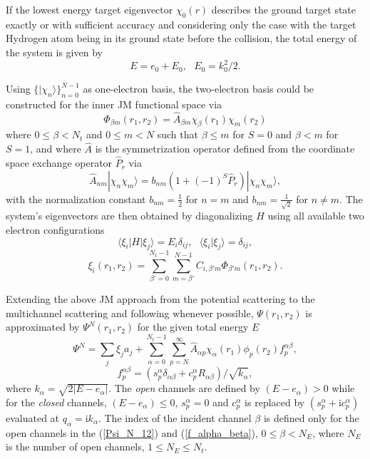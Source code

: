\documentclass[aip,pra,showpacs,aps,twocolumn,groupedaddress,floatfix]{revtex4}
\newcommand{\beq}{\begin{equation}}
\newcommand{\eeq}{\end{equation}}
\begin{document}
If the lowest energy target eigenvector $\chi_0(r)$  describes the ground target state exactly or with sufficient accuracy and considering only the case with the target Hydrogen atom being in its ground state before the collision, the total energy of the system is given by
\beq
E=e_0+E_0, \ \ \ E_0 = k_0^2/2.\label{sys_E}
\eeq

Using $\{|\chi_{n}\rangle\}_{n=0}^{N-1}$  as one-electron basis, the two-electron basis could be constructed for the inner JM functional space via
\beq
\Phi_{\beta m}(r_1, r_2) = \hat{A}_{\beta m} \chi_{\beta}(r_1) \chi_{m}(r_2) \label{Phi_beta}
\eeq
where $0 \leq \beta < N_t$  and $0 \leq m < N$ such that $\beta \leq m$ for $S=0$ and $\beta < m$ for $S=1$, and where $\hat{A}$ is the symmetrization operator defined from the coordinate space exchange operator $\hat{P}_r$ via
\beq
\hat{A}_{nm} |\chi_{n} \chi_{m} \rangle =
b_{nm} (1 + (-1)^S \hat{P}_r) |\chi_{n} \chi_{m} \rangle,
\label{A_symm}
\eeq
with the normalization constant $b_{nm}=\frac{1}{2}$ for $n=m$ and $b_{nm}=\frac{1}{\sqrt{2}}$ for $n \not= m$.
The system's eigenvectors are then obtained by diagonalizing $H$ using all available two electron configurations
\beq
\langle\xi_i|H|\xi_j\rangle=E_i\delta_{ij} , \ \ \ \langle\xi_i|\xi_j\rangle=\delta_{ij}, \label{xi_H_xi}
\eeq
\beq
\xi_i(r_1, r_2) = \sum_{\beta' =0}^{N_t-1} \sum_{m = \beta'}^{N-1} C_{i, \beta' m} \Phi_{\beta' m}(r_1, r_2). \label{C_ij}
\eeq

Extending the above JM approach from the potential scattering to the multichannel scattering and following \citet{BR76p1491} whenever possible, $\Psi(r_1, r_2)$ is approximated by $\Psi^N(r_1, r_2)$ for the given total energy $E$
\beq
\Psi^N=\sum_{j} \xi_j a_j
+ \sum_{\alpha = 0}^{N_t-1} \sum_{p=N}^{\infty} \hat{A}_{\alpha p} \chi_{\alpha}(r_1) \phi_p(r_2) f_p^{\alpha \beta}, \label{Psi_N_12}
\eeq
\beq
f_p^{\alpha \beta} = \left( s_p^{\alpha} \delta_{\alpha \beta}
+ c_p^{\alpha} R_{\alpha \beta} \right) / \sqrt{k_{\alpha}}, \label{f_alpha_beta}
\eeq
where $k_{\alpha}=\sqrt{2|E-e_{\alpha}|}$. The {\em open} channels are defined by $(E-e_{\alpha})>0$ while
for the {\em closed} channels, $(E-e_{\alpha}) \leq 0$, $s_p^{\alpha}=0$ and
$c_p^{\alpha}$ is replaced by $(s_p^{\alpha} + \mbox{i} c_p^{\alpha})$ evaluated at $q_{\alpha}=\mbox{i}k_{\alpha}$.
The index of the incident channel $\beta$ is defined only for the open channels in the (\ref{Psi_N_12}) and (\ref{f_alpha_beta}), $0 \leq \beta < N_E$, where $N_E$ is the number of open channels, $1 \leq N_E \leq N_t$.
\end{document}
